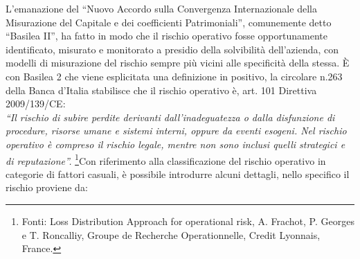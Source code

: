 \documentclass[titlepage]{article}
\begin{document}
L’emanazione del “Nuovo Accordo sulla Convergenza Internazionale della Misurazione del Capitale e dei coefficienti Patrimoniali”, comunemente detto “Basilea II”, ha fatto in modo che il rischio operativo fosse opportunamente identificato, misurato e monitorato a presidio della solvibilità dell’azienda, con modelli di misurazione del rischio sempre più vicini alle specificità della stessa. È con Basilea 2 che viene esplicitata una definizione in positivo, la circolare n.263 della Banca d’Italia stabilisce che il rischio operativo è, art. 101 Direttiva 2009/139/CE:\\
\textit{“Il rischio di subire perdite derivanti dall’inadeguatezza o dalla disfunzione di procedure, risorse umane e sistemi interni, oppure da eventi esogeni. Nel rischio operativo è compreso il rischio legale, mentre non sono inclusi quelli strategici e di reputazione”. } \newpage
 \footnote{Fonti: Loss Distribution Approach for operational risk, A. Frachot, P. Georges e T. Roncalliy, Groupe de Recherche Operationnelle, Credit Lyonnais, France.}Con riferimento alla classificazione del rischio operativo in categorie di fattori casuali, è possibile introdurre alcuni dettagli, nello specifico il rischio proviene da:
 
\end{document}
